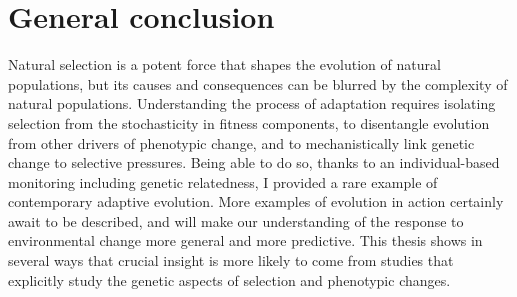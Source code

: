 \section{General conclusion}
Natural selection is a potent force that shapes the evolution of natural populations, but its causes and consequences can be blurred by the complexity of natural populations.
Understanding the process of adaptation requires isolating selection from the stochasticity in fitness components, to disentangle evolution from other drivers of phenotypic change, and to mechanistically link genetic change to selective pressures.
Being able to do so, thanks to an individual-based monitoring including genetic relatedness, I provided a rare example of contemporary adaptive evolution. More examples of evolution in action certainly await to be described, and will make our understanding of the response to environmental change more general and more predictive. This thesis shows in several ways that crucial insight is more likely to come from studies that explicitly study the genetic aspects of selection and phenotypic changes.


